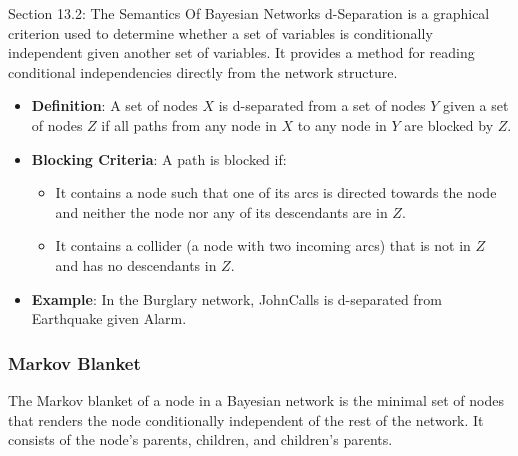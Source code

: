 \begin{notes}{Section 13.2: The Semantics Of Bayesian Networks}
    d-Separation is a graphical criterion used to determine whether a set of variables is conditionally independent given another set of variables. It provides a method for reading conditional 
    independencies directly from the network structure.
    
    \begin{highlight}[d-Separation]
    
        \begin{itemize}
            \item \textbf{Definition}: A set of nodes $X$ is d-separated from a set of nodes $Y$ given a set of nodes $Z$ if all paths from any node in $X$ to any node in $Y$ are blocked 
            by $Z$.
            \item \textbf{Blocking Criteria}: A path is blocked if:
                \begin{itemize}
                    \item It contains a node such that one of its arcs is directed towards the node and neither the node nor any of its descendants are in $Z$.
                    \item It contains a collider (a node with two incoming arcs) that is not in $Z$ and has no descendants in $Z$.
                \end{itemize}
            \item \textbf{Example}: In the Burglary network, JohnCalls is d-separated from Earthquake given Alarm.
        \end{itemize}
    
    \end{highlight}
    
    \subsubsection*{Markov Blanket}
    
    The Markov blanket of a node in a Bayesian network is the minimal set of nodes that renders the node conditionally independent of the rest of the network. It consists of the node's parents, children, 
    and children's parents.
    
    \begin{highlight}
    

\end{highlight}
\end{notes}
